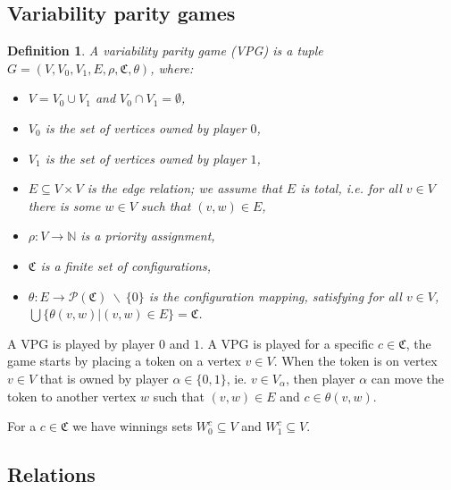 \documentclass[]{article}
\newtheorem{definition}{Definition}[section]
\begin{document}
\subsection{Variability parity games}
\begin{definition}
	A variability parity game (VPG) is a tuple $G = (V,V_0, V_1, E, \rho, \mathfrak{C}, \theta)$, where:
	\begin{itemize}
		\item $V = V_0 \cup V_1$ and $V_0 \cap V_1 = \emptyset$,
		\item $V_0$ is the set of vertices owned by player $0$,
		\item $V_1$ is the set of vertices owned by player $1$, 
		\item $E \subseteq V \times V$ is the edge relation; we assume that $E$ is total, i.e. for all $v\in V$ there is some $w \in V$ such that $(v,w) \in E$,
		\item $\rho :  V \rightarrow \mathbb{N}$ is a priority assignment,
		\item $\mathfrak{C}$ is a finite set of configurations,
		\item $\theta : E \rightarrow \mathcal{P}(\mathfrak{C})\ \backslash\ \{0\}$ is the configuration mapping, satisfying for all $v \in V$, $\bigcup\{\theta(v,w)|(v,w) \in E\} = \mathfrak{C}$.
	\end{itemize}
\end{definition}
A VPG is played by player $0$ and $1$. A VPG is played for a specific $c \in \mathfrak{C}$, the game starts by placing a token on a vertex $v \in V$. When the token is on vertex $v \in V$ that is owned by player $\alpha \in  \{0,1\}$, ie. $v \in V_\alpha$, then player $\alpha$ can move the token to another vertex $w$ such that $(v,w) \in E$ and $c \in \theta(v,w)$.

For a $c \in \mathfrak{C}$ we have winnings sets $W_0^c \subseteq V$ and $W_1^c \subseteq V$.

\subsection{Relations}
\end{document}
